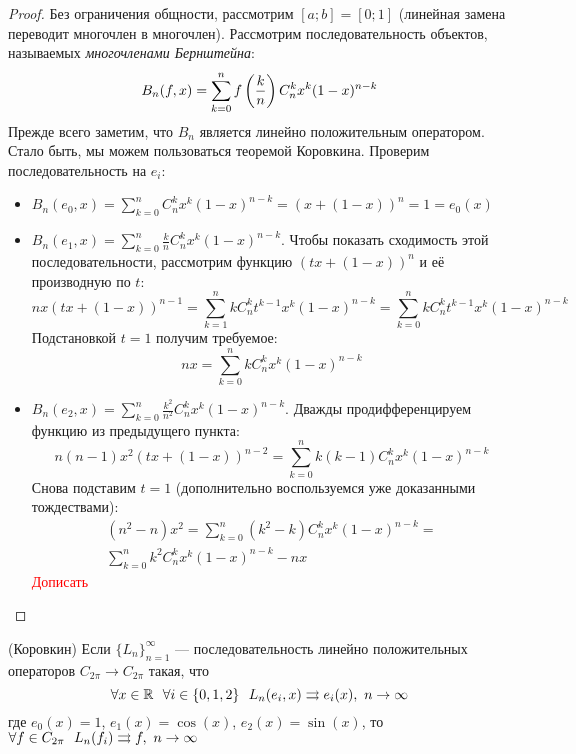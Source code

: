 \begin{proof}
	Без ограничения общности, рассмотрим $[a; b] = [0; 1]$ (линейная замена переводит многочлен в многочлен). Рассмотрим последовательность объектов, называемых \textit{многочленами Бернштейна}:
	\[
		B_n(f, x) = \sum_{k = 0}^n f\left(\frac{k}{n}\right) C_n^k x^k(1 - x)^{n - k}
	\]
	Прежде всего заметим, что $B_n$ является линейно положительным оператором. Стало быть, мы можем пользоваться теоремой Коровкина. Проверим последовательность на $e_i$:
	\begin{itemize}
		\item \(B_n(e_0, x) = \sum_{k = 0}^n C_n^k x^k(1 - x)^{n - k} = (x + (1 - x))^n = 1 = e_0(x)\)
		
		\item \(B_n(e_1, x) = \sum_{k = 0}^n \frac{k}{n} C_n^k x^k(1 - x)^{n - k}\). Чтобы показать сходимость этой последовательности, рассмотрим функцию $(tx + (1 - x))^n$ и её производную по $t$:
		\[
			nx(tx + (1 - x))^{n - 1} = \sum_{k = 1}^n kC_n^k t^{k - 1}x^k(1 - x)^{n - k} = \sum_{k = 0}^n kC_n^k t^{k - 1}x^k(1 - x)^{n - k}
		\]
		Подстановкой $t = 1$ получим требуемое:
		\[
			nx = \sum_{k = 0}^n kC_n^kx^k(1 - x)^{n - k}
		\]
		
		\item \(B_n(e_2, x) = \sum_{k = 0}^n \frac{k^2}{n^2} C_n^k x^k(1 - x)^{n - k}\). Дважды продифференцируем функцию из предыдущего пункта:
		\[
			n(n - 1)x^2(tx + (1 - x))^{n - 2} = \sum_{k = 0}^n k(k - 1)C_n^k x^k(1 - x)^{n - k}
		\]
		Снова подставим $t = 1$ (дополнительно воспользуемся уже доказанными тождествами):
		\begin{multline*}
			(n^2 - n)x^2 = \sum_{k = 0}^n (k^2 - k)C_n^k x^k(1 - x)^{n - k} =
			\\
			\sum_{k = 0}^n k^2C_n^k x^k(1 - x)^{n - k} - nx
		\end{multline*}
		\textcolor{red}{Дописать}
	\end{itemize}
\end{proof}

\begin{theorem} (Коровкин)
	Если $\{L_n\}_{n = 1}^\infty$ --- последовательность линейно положительных операторов $C_{2\pi} \to C_{2\pi}$ такая, что
	\[
		\forall x \in \mathbb{R}\ \ \forall i \in \{0, 1, 2\}\ \ L_n(e_i, x) \rightrightarrows e_i(x),\ n \to \infty
	\]
	где $e_0(x) = 1$, $e_1(x) = \cos(x)$, $e_2(x) = \sin(x)$, то $\forall f \in C_{2\pi}\ \ L_n(f_i) \rightrightarrows f,\ n \to \infty$
\end{theorem}

